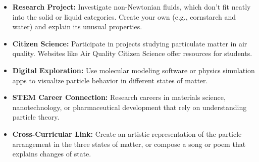 \begin{itemize}
    \item \textbf{Research Project:} Investigate non-Newtonian fluids, which don't fit neatly into the solid or liquid categories. Create your own (e.g., cornstarch and water) and explain its unusual properties.
    
    \item \textbf{Citizen Science:} Participate in projects studying particulate matter in air quality. Websites like Air Quality Citizen Science offer resources for students.
    
    \item \textbf{Digital Exploration:} Use molecular modeling software or physics simulation apps to visualize particle behavior in different states of matter.
    
    \item \textbf{STEM Career Connection:} Research careers in materials science, nanotechnology, or pharmaceutical development that rely on understanding particle theory.
    
    \item \textbf{Cross-Curricular Link:} Create an artistic representation of the particle arrangement in the three states of matter, or compose a song or poem that explains changes of state.
\end{itemize}